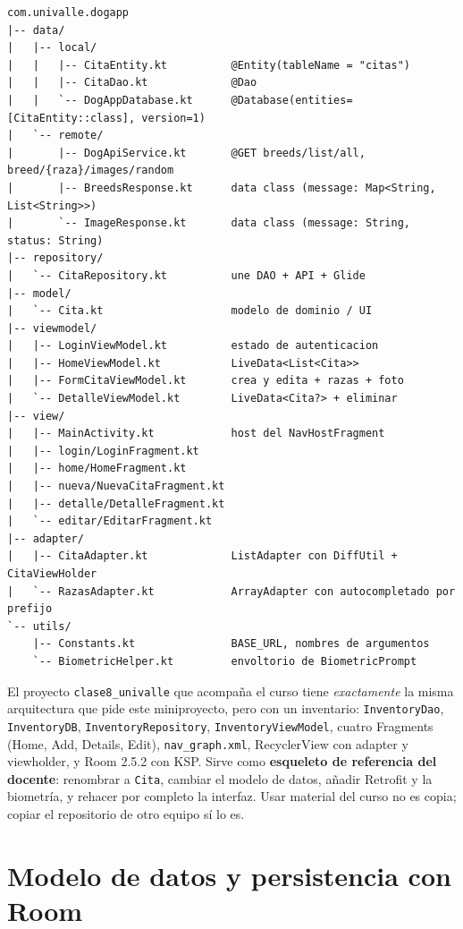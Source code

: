 \documentclass[11pt,letterpaper]{article}
\newcommand{\code}[1]{\texttt{\small #1}}
\begin{document}
\begin{verbatim}
com.univalle.dogapp
|-- data/
|   |-- local/
|   |   |-- CitaEntity.kt          @Entity(tableName = "citas")
|   |   |-- CitaDao.kt             @Dao
|   |   `-- DogAppDatabase.kt      @Database(entities=[CitaEntity::class], version=1)
|   `-- remote/
|       |-- DogApiService.kt       @GET breeds/list/all, breed/{raza}/images/random
|       |-- BreedsResponse.kt      data class (message: Map<String, List<String>>)
|       `-- ImageResponse.kt       data class (message: String, status: String)
|-- repository/
|   `-- CitaRepository.kt          une DAO + API + Glide
|-- model/
|   `-- Cita.kt                    modelo de dominio / UI
|-- viewmodel/
|   |-- LoginViewModel.kt          estado de autenticacion
|   |-- HomeViewModel.kt           LiveData<List<Cita>>
|   |-- FormCitaViewModel.kt       crea y edita + razas + foto
|   `-- DetalleViewModel.kt        LiveData<Cita?> + eliminar
|-- view/
|   |-- MainActivity.kt            host del NavHostFragment
|   |-- login/LoginFragment.kt
|   |-- home/HomeFragment.kt
|   |-- nueva/NuevaCitaFragment.kt
|   |-- detalle/DetalleFragment.kt
|   `-- editar/EditarFragment.kt
|-- adapter/
|   |-- CitaAdapter.kt             ListAdapter con DiffUtil + CitaViewHolder
|   `-- RazasAdapter.kt            ArrayAdapter con autocompletado por prefijo
`-- utils/
    |-- Constants.kt               BASE_URL, nombres de argumentos
    `-- BiometricHelper.kt         envoltorio de BiometricPrompt
\end{verbatim}

\begin{techbox}
El proyecto \code{clase8\_univalle} que acompa\~na el curso tiene \emph{exactamente}
la misma arquitectura que pide este miniproyecto, pero con un inventario:
\code{InventoryDao}, \code{InventoryDB}, \code{InventoryRepository},
\code{InventoryViewModel}, cuatro Fragments (Home, Add, Details, Edit),
\code{nav\_graph.\allowbreak{}xml}, RecyclerView con adapter y viewholder, y Room 2.5.2 con KSP.
Sirve como \textbf{esqueleto de referencia del docente}: renombrar a
\code{Cita}, cambiar el modelo de datos, a\~nadir Retrofit y la biometr\'ia, y
rehacer por completo la interfaz. Usar material del curso no es copia; copiar
el repositorio de otro equipo s\'i lo es.
\end{techbox}

\section{Modelo de datos y persistencia con Room}
\label{sec:room}
\end{document}
